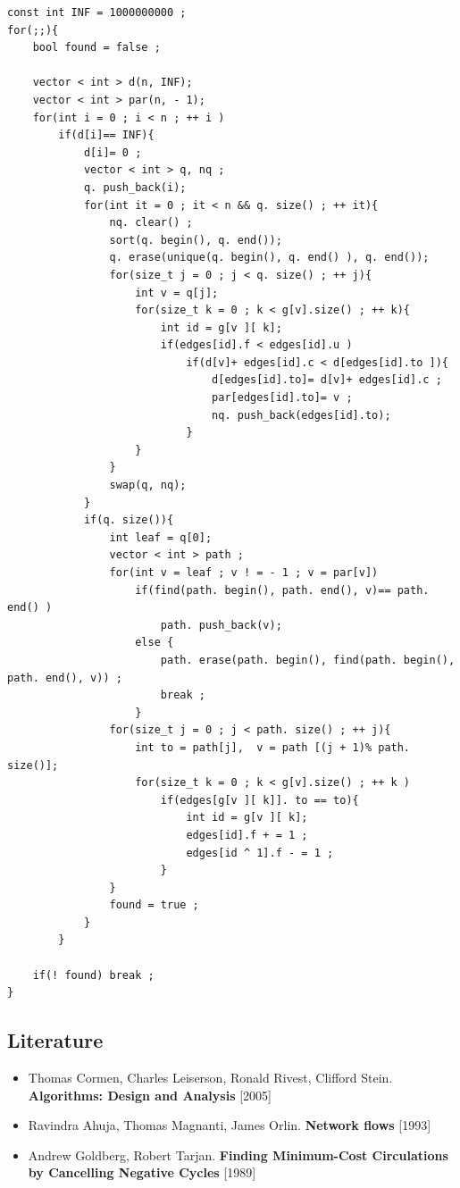 \begin{verbatim}
const int INF = 1000000000 ;
for(;;){
    bool found = false ;
 
    vector < int > d(n, INF);
    vector < int > par(n, - 1);
    for(int i = 0 ; i < n ; ++ i )
        if(d[i]== INF){
            d[i]= 0 ;
            vector < int > q, nq ;
            q. push_back(i);
            for(int it = 0 ; it < n && q. size() ; ++ it){
                nq. clear() ;
                sort(q. begin(), q. end());
                q. erase(unique(q. begin(), q. end() ), q. end());
                for(size_t j = 0 ; j < q. size() ; ++ j){
                    int v = q[j];
                    for(size_t k = 0 ; k < g[v].size() ; ++ k){
                        int id = g[v ][ k];
                        if(edges[id].f < edges[id].u )
                            if(d[v]+ edges[id].c < d[edges[id].to ]){
                                d[edges[id].to]= d[v]+ edges[id].c ;
                                par[edges[id].to]= v ;
                                nq. push_back(edges[id].to);
                            }
                    }
                }
                swap(q, nq);
            }
            if(q. size()){
                int leaf = q[0];
                vector < int > path ;
                for(int v = leaf ; v ! = - 1 ; v = par[v])
                    if(find(path. begin(), path. end(), v)== path. end() )
                        path. push_back(v);
                    else {
                        path. erase(path. begin(), find(path. begin(), path. end(), v)) ;
                        break ;
                    }
                for(size_t j = 0 ; j < path. size() ; ++ j){
                    int to = path[j],  v = path [(j + 1)% path. size()];
                    for(size_t k = 0 ; k < g[v].size() ; ++ k )
                        if(edges[g[v ][ k]]. to == to){
                            int id = g[v ][ k];
                            edges[id].f + = 1 ;
                            edges[id ^ 1].f - = 1 ;
                        }
                }
                found = true ;
            }
        }
 
    if(! found) break ;
} 
\end{verbatim}
\subsection{ Literature }

\begin{itemize} \item Thomas Cormen, Charles Leiserson, Ronald Rivest, Clifford Stein. \textbf{Algorithms: Design and Analysis} [2005] \item Ravindra Ahuja, Thomas Magnanti, James Orlin. \textbf{Network flows} [1993] \item Andrew Goldberg, Robert Tarjan. \textbf{Finding Minimum-Cost Circulations by Cancelling Negative Cycles} [1989] \end{itemize}

